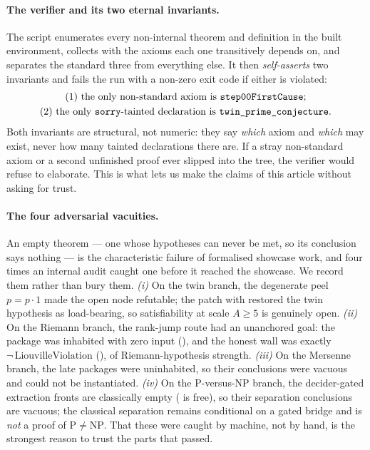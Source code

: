 \paragraph{The verifier and its two eternal invariants.}
The script  enumerates every non-internal 
theorem and definition in the built environment, collects with  the axioms each
one transitively depends on, and separates the standard three from everything else. It then
\emph{self-asserts} two invariants and fails the run with a non-zero exit code if either is
violated:
\begin{equation}\label{eq:invariants}
\begin{gathered}
\text{(1) the only non-standard axiom is }\texttt{step00FirstCause}{};\\
\text{(2) the only \texttt{sorry}-tainted declaration is }\texttt{twin\_prime\_conjecture}.
\end{gathered}
\end{equation}
Both invariants are structural, not numeric: they say \emph{which} axiom and \emph{which}
 may exist, never how many tainted declarations there are. If a stray non-standard
axiom or a second unfinished proof ever slipped into the tree, the verifier would refuse to
elaborate. This is what lets us make the claims of this article without asking for trust.

\paragraph{The four adversarial vacuities.}
An empty theorem --- one whose hypotheses can never be met, so its conclusion says nothing --- is
the characteristic failure of formalised showcase work, and four times an internal audit caught one
before it reached the showcase. We record them rather than bury them. \emph{(i)} On the twin
branch, the degenerate peel $p = p\cdot 1$ made the open node refutable; the patch 
with  restored the twin hypothesis as load-bearing, so satisfiability at scale
$A\ge 5$ is genuinely open. \emph{(ii)} On the Riemann branch, the rank-jump route had an
unanchored goal: the package  was inhabited with zero input
(), and the honest wall was exactly $\neg\,\text{LiouvilleViolation}$
(), of Riemann-hypothesis strength. \emph{(iii)} On the Mersenne branch, the late
 packages were uninhabited, so their conclusions were vacuous and could not be
instantiated. \emph{(iv)} On the P-versus-NP branch, the decider-gated extraction fronts are
classically empty ( is free), so their separation conclusions are vacuous; the
classical separation  remains conditional on a
gated bridge and is \emph{not} a proof of $\mathrm{P}\ne\mathrm{NP}$. That these were caught by
machine, not by hand, is the strongest reason to trust the parts that passed.

